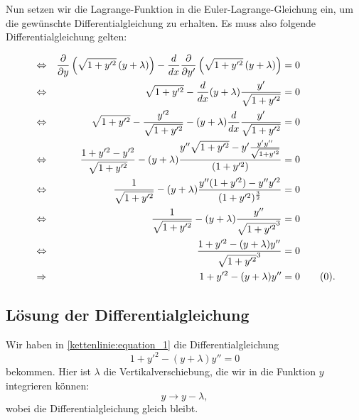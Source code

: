 Nun setzen wir die Lagrange-Funktion in die Euler-Lagrange-Gleichung ein, um die gewünschte Differentialgleichung zu erhalten. Es muss also folgende Differentialgleichung gelten:

\begin{align*}
	& \Leftrightarrow &
	\frac{\partial}{\partial y} \left( \sqrt{1 + y'^2} \, (y + \lambda) \right) - \frac{d}{dx} \frac{\partial}{\partial y'} \left( \sqrt{1 + y'^2} \, (y + \lambda) \right) 
	&=
	0
	\\
	& \Leftrightarrow &
	\sqrt{1 + y'^2} - \frac{d}{dx} (y + \lambda) \dfrac{y'}{\sqrt{1 + y'^2}}
	&=
	0
	\\
	& \Leftrightarrow &
	\sqrt{1 + y'^2} - \frac{y'^2}{\sqrt{1 + y'^2}} - (y + \lambda) \frac{d}{dx} \frac{y'}{\sqrt{1 + y'^2}}
	&=
	0
	\\
	& \Leftrightarrow &
	\frac{1 + y'^2 - y'^2}{\sqrt{1 + y'^2}} - (y + \lambda) \frac{y'' \sqrt{1 + y'^2} - y' \frac{y' y''}{\sqrt{1 + y'^2}}}{(1 + y'^2)} 
	&=
	0
	\\
	& \Leftrightarrow &
	\frac{1}{\sqrt{1 + y'^2}} - (y + \lambda) \frac{y'' (1 + y'^2) - y''y'^2}{(1 + y'^2)^ \frac{3}{2}} 
	&=
	0
	\\
	& \Leftrightarrow &
	\frac{1}{\sqrt{1 + y'^2}} - (y + \lambda) \frac{y''}{\sqrt{1 + y'^2}^3} 
	&=
	0
	\\
	& \Leftrightarrow &
	\frac{1 + y'^2 - (y + \lambda) y''} {\sqrt{1 + y'^2}^3}
	&=
	0
	\\
	& \Rightarrow &
	1 + y'^2 - (y + \lambda) y''
	&=
	0 \label{kettenlinie:equation_1} \tag{\theequation} \stepcounter{equation}.
\end{align*}

\subsection{Lösung der Differentialgleichung
\label{kettenlinie:subsection:Lösung der Differentialgleichung}}
Wir haben in \eqref{kettenlinie:equation_1} die Differentialgleichung
\begin{equation}
	1 + y'^2 - (y + \lambda) y''
	=
	0
\end{equation}
bekommen.
Hier ist \(\lambda\) die Vertikalverschiebung, die wir in die Funktion \(y\) integrieren können:
\begin{equation}
	y
	\rightarrow
	y - \lambda ,
\end{equation}
wobei die Differentialgleichung gleich bleibt.


